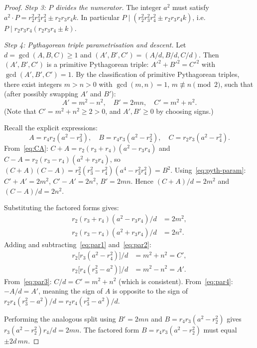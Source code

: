 \documentclass[12pt, a4paper]{article}
\theoremstyle{definition}
\DeclareMathOperator{\gcd}{gcd}
\begin{document}
\begin{proof}
  \medskip\noindent\textit{Step 3: $P$ divides the numerator.}
  The integer $a^2$ must satisfy $a^2 \cdot P = r_2^2r_3^2r_4^2 \pm r_2r_3r_4 k$.
  In particular $P \mid (r_2^2r_3^2r_4^2 \pm r_2r_3r_4 k)$, i.e.\
  $P \mid r_2r_3r_4(r_2r_3r_4 \pm k)$.

  \medskip\noindent\textit{Step 4: Pythagorean triple parametrisation and
  descent.}
  Let $d = \gcd(A,B,C) \geq 1$ and $(A',B',C') = (A/d, B/d, C/d)$.  Then
  $(A', B', C')$ is a primitive Pythagorean triple: $A'^2+B'^2=C'^2$ with
  $\gcd(A',B',C')=1$.  By the classification of primitive Pythagorean triples,
  there exist integers $m > n > 0$ with $\gcd(m,n)=1$, $m \not\equiv n
  \pmod{2}$, such that (after possibly swapping $A'$ and $B'$):
  \begin{equation}\label{eq:pyth-param}
    A' = m^2-n^2, \quad B' = 2mn, \quad C' = m^2+n^2.
  \end{equation}
  (Note that $C' = m^2+n^2 \geq 2 > 0$, and $A',B' \geq 0$ by choosing signs.)

  Recall the explicit expressions:
  \[
    A = r_4 r_2(a^2-r_3^2), \quad B = r_4 r_3(a^2-r_2^2), \quad
    C = r_2 r_3(a^2-r_4^2).
  \]
  From~\eqref{eq:CA}: $C+A = r_2(r_3+r_4)(a^2-r_3r_4)$ and
  $C-A = r_2(r_3-r_4)(a^2+r_3r_4)$, so
  $(C+A)(C-A) = r_2^2(r_3^2-r_4^2)(a^4-r_3^2r_4^2) = B^2$.
  Using~\eqref{eq:pyth-param}: $C'+A' = 2m^2$, $C'-A' = 2n^2$, $B' = 2mn$.
  Hence $(C+A)/d = 2m^2$ and $(C-A)/d = 2n^2$.

  Substituting the factored forms gives:
  \begin{align}
    r_2(r_3+r_4)(a^2-r_3r_4)/d &= 2m^2, \label{eq:par1}\\
    r_2(r_3-r_4)(a^2+r_3r_4)/d &= 2n^2. \label{eq:par2}
  \end{align}
  Adding and subtracting~\eqref{eq:par1} and~\eqref{eq:par2}:
  \begin{align}
    r_2\bigl[r_3(a^2-r_4^2) \bigr]/d  &= m^2+n^2 = C', \label{eq:par3}\\
    r_2\bigl[r_4(r_3^2-a^2)\bigr]/d &= m^2-n^2 = A'. \label{eq:par4}
  \end{align}
  From~\eqref{eq:par3}: $C/d = C' = m^2+n^2$ (which is consistent).
  From~\eqref{eq:par4}: $-A/d = A'$, meaning the sign of $A$ is opposite to the
  sign of $r_2r_4(r_3^2-a^2)/d = r_2r_4(r_3^2-a^2)/d$.

  Performing the analogous split using $B' = 2mn$ and
  $B = r_4r_3(a^2-r_2^2)$ gives $r_3(a^2-r_2^2)r_4/d = 2mn$.
  The factored form $B = r_4r_3(a^2-r_2^2)$ must equal $\pm 2d\,mn$.


\end{proof}
\end{document}
